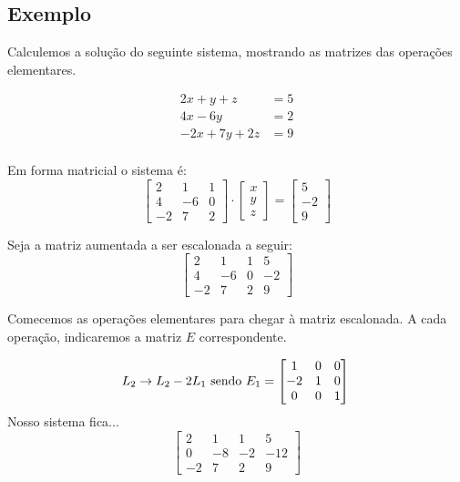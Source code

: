 \documentclass[12pt]{article}
\begin{document}
	\subsection{Exemplo}
	
	Calculemos a solução do seguinte sistema, mostrando as matrizes das operações elementares.
	
	\begin{align*}
		2x+y+z&=5\\4x-6y&=2\\-2x+7y+2z&=9
	\end{align*}\\
	
	Em forma matricial o sistema é: \\
	
	\begin{equation*}
		\begin{bmatrix}
			2 & 1 & 1\\
			4 & -6 & 0\\
			-2 & 7 & 2
		\end{bmatrix} \cdot
		\begin{bmatrix}
			x\\ y\\z
		\end{bmatrix} =
		\begin{bmatrix}
			5 \\ -2\\9
		\end{bmatrix}
	\end{equation*}
	
	
	Seja a matriz aumentada a ser escalonada a seguir: 
	\begin{equation*}
		\begin{bmatrix}
			2 & 1 & 1 & 5\\
			4 & -6 & 0 & -2\\
			-2 & 7 & 2 & 9
		\end{bmatrix}
	\end{equation*}
	
	Comecemos as operações elementares para chegar à matriz escalonada. A cada operação, indicaremos a matriz $E$ correspondente.
	
	\begin{equation*}
		L_2 \rightarrow L_2 -2L_1 \mbox{ sendo } 
		E_1=\begin{bmatrix}
			1 & 0 &0\\
			-2 & 1 & 0\\
			0 & 0 & 1
		\end{bmatrix}\\
	\end{equation*}
	Nosso sistema fica...
	\begin{equation*}
		\begin{bmatrix}
			2 & 1 & 1 & 5\\
			0 & -8 & -2 & -12\\
			-2 & 7 & 2 & 9
		\end{bmatrix}
	\end{equation*}\\
	
\end{document}
